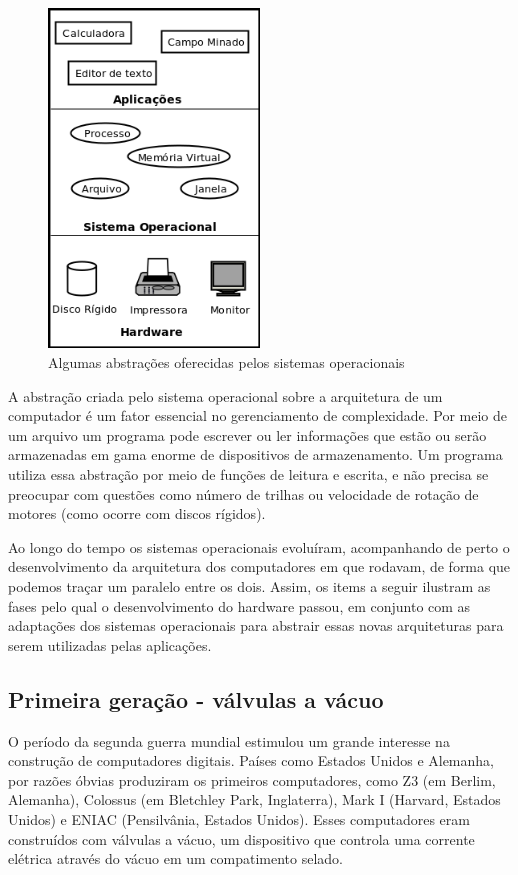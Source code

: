 \documentclass[11pt,twoside,a4paper]{book}
\begin{document}
\begin{figure}
  \centering
  \includegraphics[width=0.5\textwidth]{abstracoes_so} 
  \caption{Algumas abstrações oferecidas pelos sistemas operacionais}
  \label{fig:abstracoes_so} 
\end{figure}

A abstração criada pelo sistema operacional sobre a arquitetura de um computador é um fator essencial no gerenciamento de complexidade. Por meio de um arquivo um programa pode escrever ou ler informações que estão ou serão armazenadas em gama enorme de dispositivos de armazenamento. Um programa utiliza essa abstração por meio de funções de leitura e escrita, e não precisa se preocupar com questões como número de trilhas ou velocidade de rotação de motores (como ocorre com discos rígidos).

Ao longo do tempo os sistemas operacionais evoluíram, acompanhando de perto o desenvolvimento da arquitetura dos computadores em que rodavam, de forma que podemos traçar um paralelo entre os dois. Assim, os items a seguir ilustram as fases pelo qual o desenvolvimento do hardware passou, em conjunto com as adaptações dos sistemas operacionais para abstrair essas novas arquiteturas para serem utilizadas pelas aplicações.

\subsection*{Primeira geração - válvulas a vácuo}
 O período da segunda guerra mundial estimulou um grande interesse na construção de computadores digitais. Países como Estados Unidos e Alemanha, por razões óbvias produziram os primeiros computadores, como Z3 (em Berlim, Alemanha), Colossus (em Bletchley Park, Inglaterra), Mark I (Harvard, Estados Unidos) e ENIAC (Pensilvânia, Estados Unidos). Esses computadores eram construídos com válvulas a vácuo, um dispositivo que controla uma corrente elétrica através do vácuo em um compatimento selado.
\end{document}
